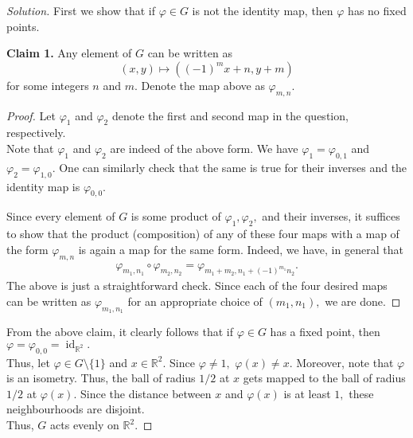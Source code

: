 \documentclass[12pt]{article}
\theoremstyle{definition}
\numberwithin{thm}{section}
\newcommand{\id}{\operatorname{id}}
\newenvironment{blockquote}
{\begin{mdframed}[skipabove=0pt, skipbelow=0pt, innertopmargin=4pt, innerbottommargin=4pt, bottomline=false,topline=false,rightline=false, linewidth=2pt]}
{\end{mdframed}}
\newenvironment{soln}{\begin{proof}[Solution]}{\end{proof}}
\begin{document}
\begin{soln}
	First we show that if $\varphi \in G$ is not the identity map, then $\varphi$ has no fixed points.\\
	\begin{blockquote}
		\textbf{Claim 1.} Any element of $G$ can be written as
		\begin{equation*} 
			(x, y) \mapsto ((-1)^mx + n, y + m)
		\end{equation*}
		for some integers $n$ and $m.$ Denote the map above as $\varphi_{m, n}.$
		\begin{proof} 
			Let $\varphi_1$ and $\varphi_2$ denote the first and second map in the question, respectively.\\
			Note that $\varphi_1$ and $\varphi_2$ are indeed of the above form. We have $\varphi_1 = \varphi_{0, 1}$ and $\varphi_2 = \varphi_{1, 0}.$ One can similarly check that the same is true for their inverses and the identity map is $\varphi_{0, 0}.$ 

			Since every element of $G$ is some product of $\varphi_1, \varphi_2,$ and their inverses, it suffices to show that the product (composition) of any of these four maps with a map of the form $\varphi_{m, n}$ is again a map for the same form. Indeed, we have, in general that
			\begin{align*} 
				\varphi_{m_1, n_1}\circ\varphi_{m_2, n_2} = \varphi_{m_1 + m_2, n_1 + (-1)^{m_1}n_2}.
			\end{align*}
			The above is just a straightforward check. Since each of the four desired maps can be written as $\varphi_{m_1, n_1}$ for an appropriate choice of $(m_1, n_1),$ we are done.
		\end{proof}
	\end{blockquote}
		From the above claim, it clearly follows that if $\varphi \in G$ has a fixed point, then $\varphi = \varphi_{0, 0} = \id_{\mathbb{R}^2}.$ \\
		Thus, let $\varphi \in G\setminus\{1\}$ and $x \in \mathbb{R}^2.$ Since $\varphi \neq 1,$ $\varphi(x) \neq x.$ Moreover, note that $\varphi$ is an isometry. Thus, the ball of radius $1/2$ at $x$ gets mapped to the ball of radius $1/2$ at $\varphi(x).$ Since the distance between $x$ and $\varphi(x)$ is at least $1,$ these neighbourhoods are disjoint.\\
		Thus, $G$ acts evenly on $\mathbb{R}^2.$


\end{soln}
\end{document}
